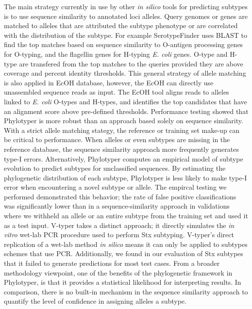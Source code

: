 \documentclass{bioinfo}
\begin{document}
The main strategy currently in use by other \textit{in silico} tools for predicting subtypes is to use sequence similarity to annotated loci alleles.
Query genomes or genes are matched to alleles that are attributed the subtype phenotype or are correlated with the distribution of the subtype.
For example SerotypeFinder uses BLAST to find the top matches based on sequence similarity to O-antigen processing genes for  O-typing, and the flagellin genes for H-typing \textit{E. coli} genes.  
O-type and H-type are transfered from the top matches to the queries provided they are above coverage and percent identity thresholds.
This general strategy of allele matching is also applied in EcOH database, however, the EcOH can directly use unassembled sequence reads as input. The EcOH tool aligns reads to alleles linked to \textit{E. coli} O-types and H-types, and identifies the top candidates that have an alignment score above pre-defined thresholds.
Performance testing showed that Phylotyper is more robust than an approach based solely on sequence similarity.
With a strict allele matching stategy, the reference or training set make-up can be critical to performance.
When alleles or even subtypes are missing in the reference database, the sequence similarity approach more frequently generates type-I errors.
Alternatively, Phylotyper computes an empirical model of subtype evolution to predict subtypes for unclassified sequences.
By estimating the phylogenetic distribution of each subtype, Phylotyper is less likely to make type-I error when encountering a novel subtype or allele. 
The empircal testing we performed demonstrated this behavior; 
the rate of false positive classifications was significantly lower than in a sequence-similarity approach in validations where we withheld an allele or an entire subtype from the training set and used it as a test input.
V-typer takes a distinct approach; it directly simulates the \textit{in vitro} wet-lab PCR procedure used to perform Stx subtyping. 
V-typer's direct replication of a wet-lab method \textit{in silico} means it can only be applied to subtypes schemes that use PCR. 
Additionally, we found in our evaluation of Stx subtypes that it failed to generate predictions for most test cases.
From a broader methodology viewpoint, one of the benefits of the phylogenetic framework in Phylotyper, is that it provides a statistical likelihood for interpreting results.
In comparison, there is no built-in mechanism in the sequence similarity approach to quantify the level of confidence in assigning alleles a subtype.
\end{document}

